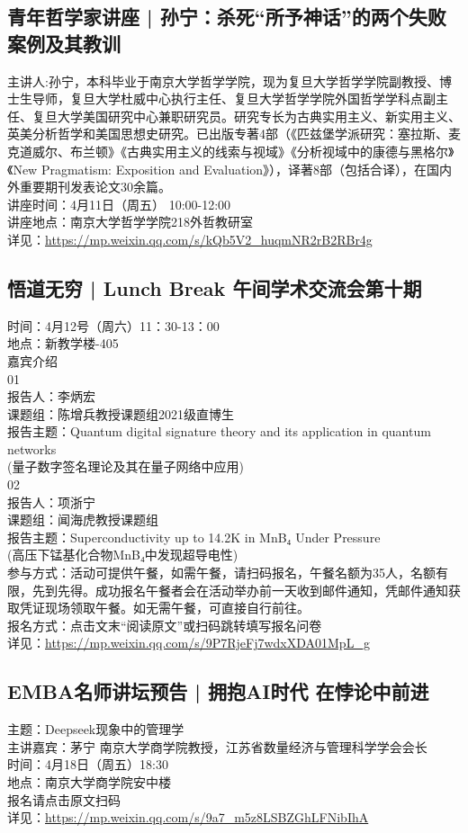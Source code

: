 \documentclass[letterpaper, 12pt]{article}
\begin{document}
\begin{multicols}{2}
\section{青年哲学家讲座 | 孙宁：杀死“所予神话”的两个失败案例及其教训}
主讲人:孙宁，本科毕业于南京大学哲学学院，现为复旦大学哲学学院副教授、博士生导师，复旦大学杜威中心执行主任、复旦大学哲学学院外国哲学学科点副主任、复旦大学美国研究中心兼职研究员。研究专长为古典实用主义、新实用主义、英美分析哲学和美国思想史研究。已出版专著4部（《匹兹堡学派研究：塞拉斯、麦克道威尔、布兰顿》《古典实用主义的线索与视域》《分析视域中的康德与黑格尔》《New Pragmatism: Exposition and Evaluation》），译著8部（包括合译），在国内外重要期刊发表论文30余篇。
\\讲座时间：4月11日（周五）  10:00-12:00
\\讲座地点：南京大学哲学学院218外哲教研室
\\详见：\url{https://mp.weixin.qq.com/s/kQb5V2_huqmNR2rB2RBr4g}

\subsection{悟道无穷 | Lunch Break 午间学术交流会第十期}
时间：4月12号（周六）11：30-13：00
\\地点：新教学楼-405
\\嘉宾介绍
\\01
\\报告人：李炳宏
\\课题组：陈增兵教授课题组2021级直博生
\\报告主题：Quantum digital signature theory and its application in quantum networks
\\(量子数字签名理论及其在量子网络中应用)
\\02
\\报告人：项浙宁
\\课题组：闻海虎教授课题组
\\报告主题：Superconductivity up to 14.2K in MnB₄ Under Pressure
\\ (高压下锰基化合物MnB₄中发现超导电性)
\\参与方式：活动可提供午餐，如需午餐，请扫码报名，午餐名额为35人，名额有限，先到先得。成功报名午餐者会在活动举办前一天收到邮件通知，凭邮件通知获取凭证现场领取午餐。如无需午餐，可直接自行前往。
\\报名方式：点击文末“阅读原文”或扫码跳转填写报名问卷
\\详见：\url{https://mp.weixin.qq.com/s/9P7RjeFj7wdxXDA01MpL_g}

\subsection{EMBA名师讲坛预告 | 拥抱AI时代 在悖论中前进}
主题：Deepseek现象中的管理学
\\主讲嘉宾：茅宁 南京大学商学院教授，江苏省数量经济与管理科学学会会长
\\时间：4月18日（周五）18:30
\\地点：南京大学商学院安中楼
\\报名请点击原文扫码
\\详见：\url{https://mp.weixin.qq.com/s/9a7_m5z8LSBZGhLFNibIhA}


\end{multicols}
\end{document}
